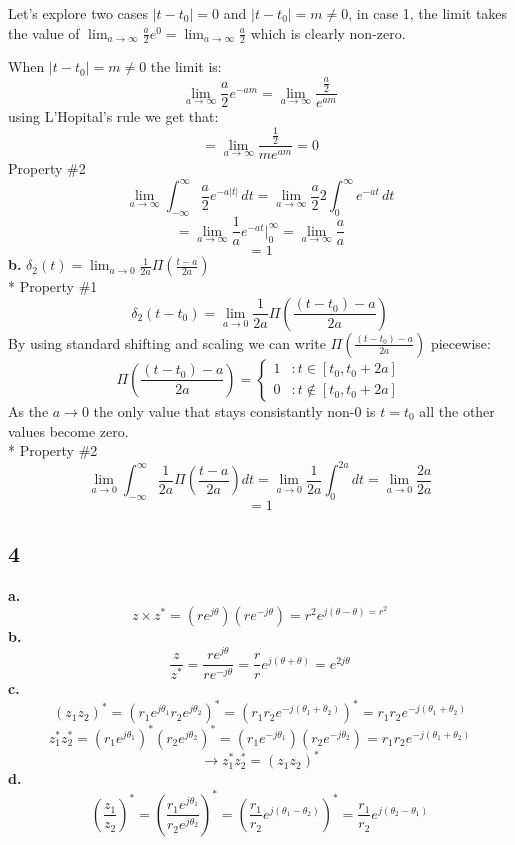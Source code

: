 \documentclass[10pt, letterpaper]{article}
\begin{document}
Let's explore two cases $|t - t_0| = 0$ and $|t - t_0| = m \neq 0$, in case 1, 
the limit takes the value of $\lim_{a \to \infty} \frac{a}{2} e^{0} = \lim_{a \to \infty} \frac{a}{2}$ 
which is clearly non-zero.

When $|t - t_0| = m \neq 0$ the limit is:
\[
\lim_{a \to \infty} \frac{a}{2} e^{-am} = 
\lim_{a \to \infty} \frac{\frac{a}{2} }{e^{am}}
\]
using L'Hopital's rule we get that:
\[ =
\lim_{a \to \infty} \frac{\frac{1}{2} }{me^{am}} = 0
\]
Property \#2
\[
\lim_{a \to \infty} \int_{-\infty}^{\infty}\frac{a}{2} e^{-a|t|}\,dt = 
\lim_{a \to \infty} \frac{a}{2} 2 \int_{0}^{\infty} e^{-at}\,dt 
\]
\[
= \lim_{a \to \infty} \frac{1}{a} e^{-at} |_{0}^{\infty}
= \lim_{a \to \infty} \frac{a}{a}
\]
\[= 1\]
\textbf{b.}
$\delta_2(t) = \lim_{a \to 0} \frac{1}{2a} \Pi(\frac{t - a}{2a})$\\*
Property \#1
\[
\delta_2(t - t_0) = \lim_{a \to 0} \frac{1}{2a} \Pi(\frac{(t -t_0) - a}{2a})
\]
By using standard shifting and scaling we can write $\Pi(\frac{(t -t_0) - a}{2a})$ piecewise:
\[\Pi(\frac{(t -t_0) - a}{2a}) = \left\{
  \begin{array}{lr}
    1 & : t \in [t_0, t_0 + 2a]\\
    0 & : t \not\in [t_0, t_0 + 2a]
  \end{array}
\right.
\]
As the $a \to 0$ the only value that stays consistantly non-0 is $t = t_0$
all the other values become zero.
\\*
Property \#2
\[
\lim_{a \to 0} \int_{-\infty}^{\infty}\frac{1}{2a} \Pi(\frac{t - a}{2a})dt = 
\lim_{a \to 0} \frac{1}{2a} \int_{0}^{2a}dt 
= \lim_{a \to 0} \frac{2a}{2a} 
\]
\[= 1\]
\subsection*{4}
\textbf{a.}
\[z \times z^* = (re^{j\theta})(re^{-j\theta}) = r^2 e^{j(\theta - \theta) = r^2} \]
\textbf{b.}
\[ \frac{z}{z^*} = \frac{re^{j\theta}}{re^{-j\theta}} = \frac{r}{r} e^{j (\theta + \theta)} = e^{2j\theta} \]
\textbf{c.}
\[(z_1 z_2)^* = (r_1 e^{j \theta_1} r_2 e^{j \theta_2})^* = (r_1 r_2 e^{-j(\theta_1 + \theta_2)})^* = r_1 r_2 e^{-j(\theta_1 + \theta_2)}\]
\[z_1^* z_2^* = (r_1e^{j\theta_1})^* (r_2e^{j\theta_2})^* = (r_1e^{-j\theta_1}) (r_2e^{-j\theta_2})  = r_1 r_2 e^{-j(\theta_1 + \theta_2)} \]
\[\rightarrow z_1^* z_2^* = (z_1 z_2)^*\]
\textbf{d.}
\[
(\frac{z_1}{z_2})^*  = (\frac{r_1e^{j\theta_1}}{r_2e^{j\theta_2}})^* =   (\frac{r_1}{r_2} e^{j(\theta_1 - \theta_2)})^* =     
\frac{r_1}{r_2} e^{j(\theta_2 - \theta_1)}
\]
\end{document}
